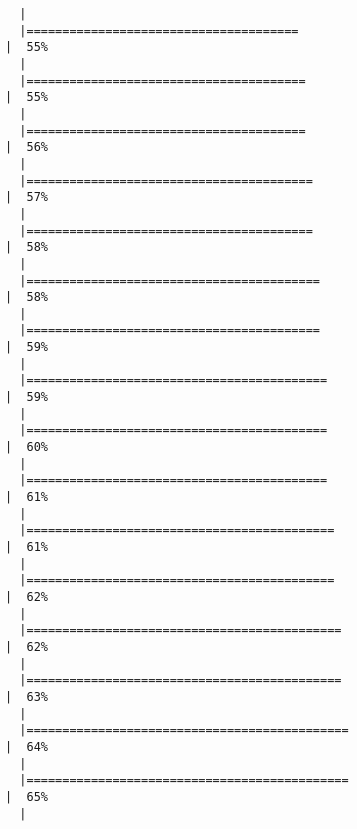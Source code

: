 \documentclass[
  letterpaper,
]{book}
\begin{document}
\begin{verbatim}
  |                                                                            
  |======================================                                |  55%
  |                                                                            
  |=======================================                               |  55%
  |                                                                            
  |=======================================                               |  56%
  |                                                                            
  |========================================                              |  57%
  |                                                                            
  |========================================                              |  58%
  |                                                                            
  |=========================================                             |  58%
  |                                                                            
  |=========================================                             |  59%
  |                                                                            
  |==========================================                            |  59%
  |                                                                            
  |==========================================                            |  60%
  |                                                                            
  |==========================================                            |  61%
  |                                                                            
  |===========================================                           |  61%
  |                                                                            
  |===========================================                           |  62%
  |                                                                            
  |============================================                          |  62%
  |                                                                            
  |============================================                          |  63%
  |                                                                            
  |=============================================                         |  64%
  |                                                                            
  |=============================================                         |  65%
  |                                                                            

\end{verbatim}
\end{document}
